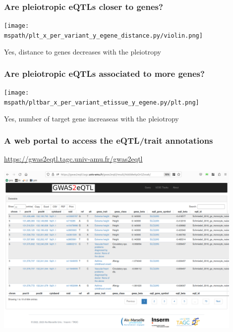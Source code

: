 \documentclass{beamer}
\newcommand*{\mspath}{../../out/gwas417/pval_5e-08/r2_0.1/kb_1000/window_1000000/75_50}%
\begin{document}
    \begin{frame}
        \frametitle{Are pleiotropic eQTLs closer to genes?}

        \begin{center}
            \texttt{[image: \\mspath/plt\_x\_per\_variant\_y\_egene\_distance.py/violin.png]}
        \end{center}
        \vfill
        Yes, distance to genes decreases with the pleiotropy

    \end{frame}

    \begin{frame}
        \frametitle{Are pleiotropic eQTLs associated to more genes?}

        \begin{center}
            \texttt{[image: \\mspath/pltbar\_x\_per\_variant\_etissue\_y\_egene.py/plt.png]}
        \end{center}
        \vfill
        Yes, number of target gene increaseas with the pleiotropy

    \end{frame}

    \begin{frame}
        \frametitle{A web portal to access the eQTL/trait annotations}

        \url{https://gwas2eqtl.tagc.univ-amu.fr/gwas2eqtl}

        \begin{center}
            \includegraphics[width=0.9\textwidth]{fig/gwas2eqtl.png}
        \end{center}

    \end{frame}
\end{document}

